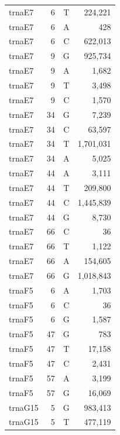 \documentclass[12pt]{rockefeller}
\begin{document}
{\begin{center}
\begin{supertabular}{|l|r|c|r|}
  trnaE7 &         6 &          T &    224,221 \\
  trnaE7 &         6 &          A &        428 \\
  trnaE7 &         6 &          C &    622,013 \\
  trnaE7 &         9 &          G &    925,734 \\
  trnaE7 &         9 &          A &      1,682 \\
  trnaE7 &         9 &          T &      3,498 \\
  trnaE7 &         9 &          C &      1,570 \\
  trnaE7 &        34 &          G &      7,239 \\
  trnaE7 &        34 &          C &     63,597 \\
  trnaE7 &        34 &          T &  1,701,031 \\
  trnaE7 &        34 &          A &      5,025 \\
  trnaE7 &        44 &          A &      3,111 \\
  trnaE7 &        44 &          T &    209,800 \\
  trnaE7 &        44 &          C &  1,445,839 \\
  trnaE7 &        44 &          G &      8,730 \\
  trnaE7 &        66 &          C &         36 \\
  trnaE7 &        66 &          T &      1,122 \\
  trnaE7 &        66 &          A &    154,605 \\
  trnaE7 &        66 &          G &  1,018,843 \\
  trnaF5 &         6 &          A &      1,703 \\
  trnaF5 &         6 &          C &         36 \\
  trnaF5 &         6 &          G &      1,587 \\
  trnaF5 &        47 &          G &        783 \\
  trnaF5 &        47 &          T &     17,158 \\
  trnaF5 &        47 &          C &      2,431 \\
  trnaF5 &        57 &          A &      3,199 \\
  trnaF5 &        57 &          G &     16,069 \\
 trnaG15 &         5 &          G &    983,413 \\
 trnaG15 &         5 &          T &    477,119 \\

\end{supertabular}
\end{center}}
\end{document}
